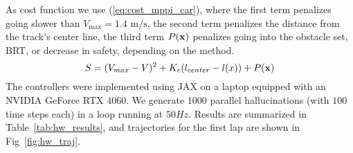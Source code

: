 As cost function we use (\ref{eq:cost_mppi_car}), where the first term penalizes going slower than $V_\text{max}=1.4\text{ m/s}$, the second term penalizes the distance from the track's center line, the third term $P(\mathbf{x})$ penalizes going into the obstacle set, BRT, or decrease in safety, depending on the method.
\begin{equation}\small
\label{eq:cost_mppi_car}
S = (V_{max}-V)^2 + K_{c} (l_{center}-l(x)) +  P(\mathbf{x})
\end{equation}
%
The controllers were implemented using JAX \cite{jax} on a laptop equipped with an NVIDIA GeForce RTX 4060. 
We generate $1000$ parallel hallucinations (with $100$ time steps each) in a loop running at $50Hz$. Results are summarized in Table~\ref{tab:hw_results}, and trajectories for the first lap are shown in Fig~\ref{fig:hw_traj}.

